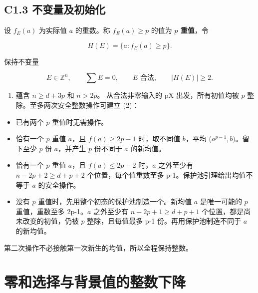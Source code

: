 \subsection*{\texorpdfstring{{C1.3} {不变量及初始化}}{C1.3 不变量及初始化}}\label{C1-h5}

{设} {\ensuremath{f_{E}(a)}} {为实际值} {\ensuremath{a}} {的重数。称} {\ensuremath{f_{E}(a)\ge p}} {的值为} \textbf{{\ensuremath{p}} {重值}}{，令}

\[
H(E)=\{a:f_E(a)\ge p\}.
\]

{保持不变量}

\[
E\in\mathbb Z^n,\qquad \sum E=0,\qquad E\text{ 合法},\qquad |H(E)|\ge2.
\tag{C1.2}
\]

\begin{enumerate}
\def\labelenumi{(\arabic{enumi})}
\tightlist
\item
  {蕴含} {\ensuremath{n\ge d+3p}} {和} {\ensuremath{n>2p}。} {从合法非零输入的} {pX} {出发，所有初值均被} {\ensuremath{p}} {整除。至多两次安全整数操作可建立} {(2)：}
\end{enumerate}

\begin{itemize}
\tightlist
\item
  {已有两个} {\ensuremath{p}} {重值时无需操作。}
\item
  {恰有一个} {\ensuremath{p}} {重值} {\ensuremath{a}，且} {\ensuremath{f(a)\ge 2p-1}} {时，取不同值} {\ensuremath{b}，平均} {(\ensuremath{a^{p-1},b)}。留下至少} {\ensuremath{p}} {份} {\ensuremath{a}，并产生} {\ensuremath{p}} {份不同于} {\ensuremath{a}} {的新均值。}
\item
  {恰有一个} {\ensuremath{p}} {重值} {\ensuremath{a}，且} {\ensuremath{f(a)\le 2p-2}} {时，\ensuremath{a}} {之外至少有} {\ensuremath{n-2p+2\ge d+p+2}} {个位置，每个值重数至多} {p-1。保护池引理给出均值不等于} {\ensuremath{a}} {的安全操作。}
\item
  {没有} {\ensuremath{p}} {重值时，先用整个初态的保护池制造一个。新均值} {\ensuremath{a}} {是唯一可能的} {\ensuremath{p}} {重值，重数至多} {2p-1。\ensuremath{a}} {之外至少有} {\ensuremath{n-2p+1\ge d+p+1}} {个位置，都是尚未改变的初值，仍被} {\ensuremath{p}} {整除，且每值最多} {p-1} {份。再用保护池制造不同于} {\ensuremath{a}} {的新均值。}
\end{itemize}

{第二次操作不必接触第一次新生的均值，所以全程保持整数。}


\section{零和选择与背景值的整数下降}\label{construct:packing}

